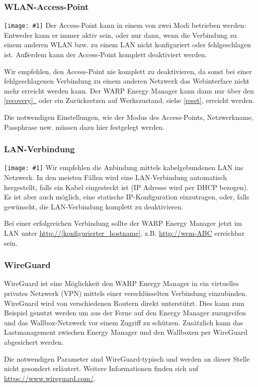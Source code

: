 \documentclass[a4paper,10pt]{article}
\newcommand{\hint}[1]{\begin{tcolorbox}[colback=boxgray,colframe=black,coltext=
white,title=Hinweis,left*=2mm,right*=2mm,boxsep=1mm,bottom=1mm,top=1mm]#1\end{tcolorbox}}
\newcommand{\gfx}[1]{\texttt{[image: \#1]}}
\newcommand*{\fullref}[1]{\hyperref[{#1}]{\ref*{#1}~\nameref*{#1}}}
\begin{document}
\begin{multicols*}{2}
	\subsubsection{WLAN-Access-Point}
	\gfx{./img/resized/web_wifi_ap}
	Der Access-Point kann in einem von zwei Modi betrieben werden: Entweder kann er immer aktiv sein,
	oder nur dann, wenn die Verbindung zu einem anderen WLAN bzw. zu einem LAN nicht konfiguriert oder fehlgeschlagen ist.
	Außerdem kann der Access-Point komplett deaktiviert werden.
	\hint{Wir empfehlen, den Access-Point nie komplett zu deaktivieren, da sonst bei einer
		fehlgeschlagenen Verbindung zu einem anderen Netzwerk das Webinterface nicht mehr erreicht
		werden kann. Der WARP Energy Manager kann dann nur über den \fullref{recovery} oder ein Zurücksetzen auf Werkszustand, siehe \ref{reset}, erreicht werden.}
	Die notwendigen Einstellungen, wie der Modus des Access-Points,
	Netzwerkname, Passphrase usw. müssen dazu hier festgelegt werden.

	\subsubsection{LAN-Verbindung}
	\gfx{./img/resized/web_ethernet}
	Wir empfehlen die Anbindung mittels kabelgebundenen LAN ins Netzwerk.
	In den meisten Fällen wird eine
	LAN-Verbindung automatisch hergestellt, falls ein Kabel eingesteckt ist
	(IP Adresse wird per DHCP bezogen). Es ist aber auch möglich,
	eine statische IP-Konfiguration	einzutragen, oder, falls gewünscht, die LAN-Verbindung
	komplett zu deaktivieren.

	Bei einer erfolgreichen Verbindung sollte der WARP Energy Manager jetzt im LAN unter
	\url{http://[konfigurierter_hostname]}, z.B. \url{http://wem-ABC} erreichbar sein.


	\subsubsection{WireGuard}

	WireGuard ist eine Möglichkeit den WARP Energy Manager in ein virtuelles privates Netzwerk (VPN)
	mittels einer verschlüsselten Verbindung einzubinden. WireGuard wird von
	verschiedenen Routern direkt unterstützt. Dies kann zum Beispiel genutzt
	werden um aus der Ferne auf den Energy Manager zuzugreifen und das
	Wallbox-Netzwerk vor einem Zugriff zu schützen. Zusätzlich kann das
	Lastmanagement zwischen Energy Manager und den Wallboxen per WireGuard abgesichert werden.

	Die notwendigen Parameter sind WireGuard-typisch und werden an dieser Stelle
	nicht gesondert erläutert. Weitere Informationen finden sich auf
	\url{https://www.wireguard.com/}.


\end{multicols*}
\end{document}
